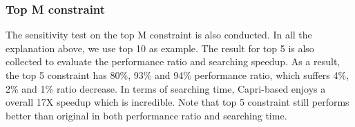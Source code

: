     \subsubsection{Top M constraint}
    \label{sec:top_m}
    The sensitivity test on the top M constraint is also conducted. In all the
    explanation above, we use top 10 as example. The result for top 5 is
    also collected to evaluate the performance ratio and searching speedup.
    As a result, the top 5 constraint has 80\%, 93\% and 94\% performance ratio,
    which suffers 4\%, 2\% and 1\% ratio decrease. In terms of searching time,
    Capri-based \atl enjoys a overall 17X speedup which is incredible. Note
    that top 5 constraint still performs better than original \atl in both
    performance ratio and searching time. 
